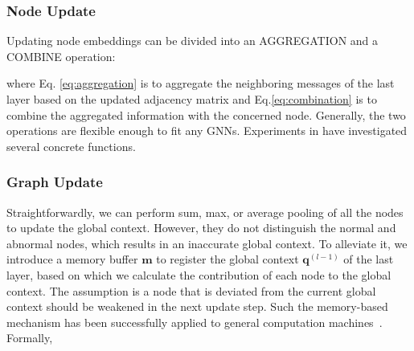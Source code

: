



\subsubsection{Node Update}
Updating node embeddings can be divided into an AGGREGATION and a COMBINE operation:


\noindent where Eq. \eqref{eq:aggregation} is to aggregate the neighboring messages of the last layer based on the updated adjacency matrix and Eq.\eqref{eq:combination} is to combine the aggregated information with the concerned node. Generally, the two operations are flexible enough to fit any GNNs. Experiments in  have investigated several concrete functions.



\subsubsection{Graph Update}
Straightforwardly, we can perform sum, max, or average pooling of all the nodes to update the global context. However, they do not distinguish the normal and abnormal nodes, which results in an inaccurate global context. To alleviate it, we introduce a memory buffer $\boldsymbol{m}$ to register the global context $\boldsymbol{q}^{(l-1)}$ of the last layer, based on which we calculate the contribution of each node to the global context. The assumption is a node that is deviated from the current global context should be weakened in the next update step. Such the memory-based mechanism has been successfully applied to general computation machines~\cite{bahdanau2015neural, weston2014memory}. Formally,


